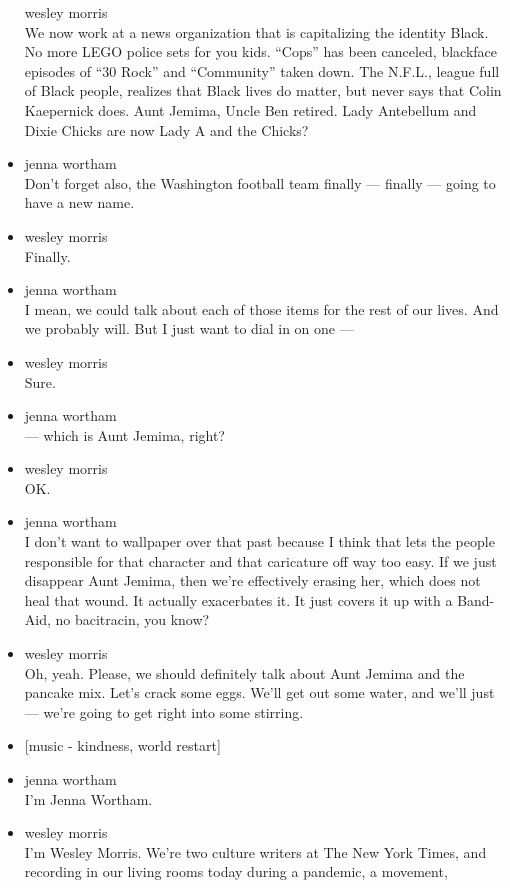 \begin{itemize}
  wesley morris\\
  We now work at a news organization that is capitalizing the identity
  Black. No more LEGO police sets for you kids. ``Cops'' has been
  canceled, blackface episodes of ``30 Rock'' and ``Community'' taken
  down. The N.F.L., league full of Black people, realizes that Black
  lives do matter, but never says that Colin Kaepernick does. Aunt
  Jemima, Uncle Ben retired. Lady Antebellum and Dixie Chicks are now
  Lady A and the Chicks?
\item
  jenna wortham\\
  Don't forget also, the Washington football team finally --- finally
  --- going to have a new name.
\item
  wesley morris\\
  Finally.
\item
  jenna wortham\\
  I mean, we could talk about each of those items for the rest of our
  lives. And we probably will. But I just want to dial in on one ---
\item
  wesley morris\\
  Sure.
\item
  jenna wortham\\
  --- which is Aunt Jemima, right?
\item
  wesley morris\\
  OK.
\item
  jenna wortham\\
  I don't want to wallpaper over that past because I think that lets the
  people responsible for that character and that caricature off way too
  easy. If we just disappear Aunt Jemima, then we're effectively erasing
  her, which does not heal that wound. It actually exacerbates it. It
  just covers it up with a Band-Aid, no bacitracin, you know?
\item
  wesley morris\\
  Oh, yeah. Please, we should definitely talk about Aunt Jemima and the
  pancake mix. Let's crack some eggs. We'll get out some water, and
  we'll just --- we're going to get right into some stirring.
\item
  {[}music - kindness, world restart{]}
\item
  jenna wortham\\
  I'm Jenna Wortham.
\item
  wesley morris\\
  I'm Wesley Morris. We're two culture writers at The New York Times,
  and recording in our living rooms today during a pandemic, a movement,

\end{itemize}
